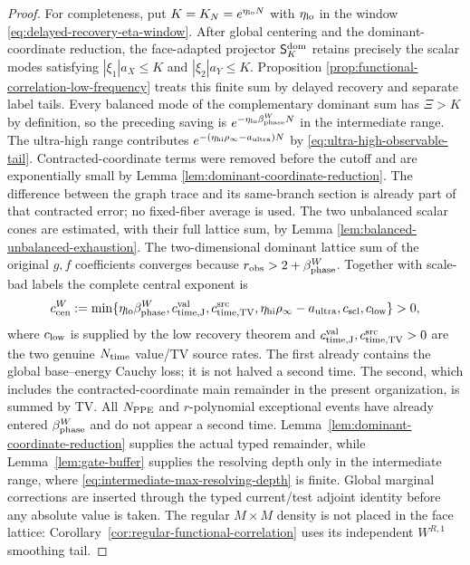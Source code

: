 \documentclass[11pt]{article}
\begin{document}
\begin{proof}
For completeness, put $K=K_N=e^{\eta_{\rm lo}N}$ with
$\eta_{\rm lo}$ in the window
\eqref{eq:delayed-recovery-eta-window}.  After global centering and the
dominant-coordinate reduction, the face-adapted projector
$\mathsf S_K^{\rm dom}$ retains precisely the scalar modes satisfying
$|\xi_1|a_X\le K$ and $|\xi_2|a_Y\le K$.  Proposition
\ref{prop:functional-correlation-low-frequency} treats this finite sum by
delayed recovery and separate label tails.  Every balanced mode of the complementary dominant
sum has $\Xi>K$ by definition, so the preceding saving is
$e^{-\eta_{\rm lo}\beta_{\rm phase}^{W}N}$ in the intermediate range.  The
ultra-high range contributes
$e^{-(\eta_{\rm hi}\rho_\infty-a_{\rm ultra})N}$ by
\eqref{eq:ultra-high-observable-tail}.  Contracted-coordinate terms were removed before
the cutoff and are exponentially small by Lemma
\ref{lem:dominant-coordinate-reduction}.  The difference between the graph
trace and its same-branch section is already part of that contracted error;
no fixed-fiber average is used.  The two unbalanced scalar cones are
estimated, with their full lattice sum, by Lemma
\ref{lem:balanced-unbalanced-exhaustion}.  The two-dimensional dominant
lattice sum of the original $g,f$ coefficients converges because
\(r_{\rm obs}>2+\beta_{\rm phase}^{W}\).  Together with scale-bad labels the
complete central exponent is
\begin{equation}
\label{eq:complete-central-exponent}
 c_{\rm cen}^{W}:=\min\{\eta_{\rm lo}\beta_{\rm phase}^{W},
 c_{\rm time,J}^{\rm val},c_{\rm time,TV}^{\rm src},
 \eta_{\rm hi}\rho_\infty-a_{\rm ultra},c_{\rm scl},
 c_{\rm low}\}>0,
\end{equation}
where $c_{\rm low}$ is supplied by the low recovery theorem and
$c_{\rm time,J}^{\rm val},c_{\rm time,TV}^{\rm src}>0$ are the two genuine
$N_{\rm time}$ value/TV source rates.  The first already contains the global
base--energy Cauchy loss; it is not halved a second time.  The second, which
includes the contracted-coordinate main remainder in the present
organization, is summed by TV.  All
$N_{\rm PPE}$ and $r$-polynomial exceptional events have already entered
$\beta_{\rm phase}^{W}$ and do not appear a second time.
Lemma~\ref{lem:dominant-coordinate-reduction} supplies the actual typed
remainder, while Lemma~\ref{lem:gate-buffer} supplies the
resolving depth only in the intermediate range, where
\eqref{eq:intermediate-max-resolving-depth} is finite.  Global marginal corrections are inserted through the typed
current/test adjoint identity before any absolute value is taken.  The
regular $M\times M$ density is not placed in the face lattice:
Corollary~\ref{cor:regular-functional-correlation} uses its independent
$W^{R,1}$ smoothing tail.
\end{proof}
\end{document}
